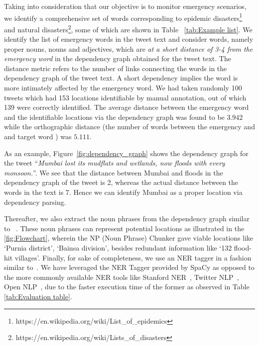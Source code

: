 Taking into consideration that our objective is to monitor emergency scenarios, we identify a comprehensive set of words corresponding to 
epidemic disasters\footnote{https://en.wikipedia.org/wiki/List\_of\_epidemics} and natural disasters\footnote{https://en.wikipedia.org/wiki/Lists\_of\_disasters}, some of which are shown in Table ~\ref{tab:Example list}.
We identify the list of emergency words in the tweet text and consider words, namely proper nouns, nouns and adjectives, which are {\it at a short distance of 3-4 from the emergency word} in the dependency graph obtained for the tweet text.
The distance metric refers to the number of links connecting the words in the dependency graph of the tweet text. A short dependency implies the word is more intimately affected by the emergency word.
We had taken randomly 100 tweets which had 153 locations identifiable by manual annotation, out of which 139 were correctly identified. The average distance between the emergency word and the identifiable locations via the dependency graph was found to be $3.942$ while the orthographic distance (the number of words between the emergency and and target word ) was $5.111$.

As an example, Figure~\ref{fig:dependency_graph} shows the dependency graph for the tweet ``{\it Mumbai lost its mudflats and wetlands, now floods with every monsoon.}''.
We see that the distance between Mumbai and floods in the dependency graph of the tweet is 2, whereas the actual distance between the words in the text is 7. Hence we can identify Mumbai as a proper location via dependency parsing.

Thereafter, we also extract the noun phrases from the dependency graph similar to ~\cite{Malmasi}. These noun phrases can represent potential locations as illustrated in the \ref{fig:Flowchart}, wherein the NP (Noun Phrase) Chunker gave viable locations like `Purnia district', `Bainsa division', besides redundant information like `132 flood-hit villages'. 
Finally, for sake of completeness, we use an NER tagger in a fashion similar 
to~\cite{Malmasi,lingad,gelernter}. 
We have leveraged the NER Tagger provided by SpaCy as opposed to the more commonly available NER tools like Stanford NER~\cite{StanfordNER}, 
Twitter NLP~\cite{TwitterNLP1}, 
Open NLP~\cite{OpenNLP}, due to the faster execution time of the former as observed in Table \ref{tab:Evaluation table}.



